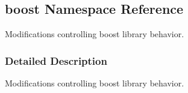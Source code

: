 \hypertarget{namespaceboost}{
\subsection{boost Namespace Reference}
\label{namespaceboost}
}


Modifications controlling boost library behavior.  




\subsubsection{Detailed Description}
Modifications controlling boost library behavior. 